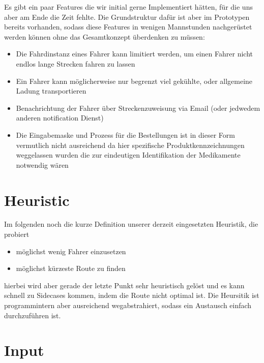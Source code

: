 \documentclass[a4]{article}
\begin{document}
Es gibt ein paar Features die wir initial gerne Implementiert hätten, für die uns aber am Ende die Zeit fehlte. Die Grundstruktur dafür ist aber im Prototypen bereits vorhanden, sodass diese Features in wenigen
Mannstunden nachgerüstet werden können ohne das Gesamtkonzept überdenken zu müssen:

\begin{itemize}
\item Die Fahrdinstanz eines Fahrer kann limitiert werden, um einen Fahrer nicht endlos lange Strecken fahren zu lassen
\item Ein Fahrer kann möglicherweise nur begrenzt viel gekühlte, oder allgemeine Ladung transportieren
\item Benachrichtung der Fahrer über Streckenzuweisung via Email (oder jedwedem anderen notification Dienst)
\item Die Eingabemaske und Prozess für die Bestellungen ist in dieser Form vermutlich nicht ausreichend da hier spezifische Produktkennzeichnungen weggelassen wurden die zur eindeutigen Identifikation der Medikamente notwendig wären
\end{itemize}

\section{Heuristic}

Im folgenden noch die kurze Definition unserer derzeit eingesetzten Heuristik, die probiert

\begin{itemize}
\item möglichst wenig Fahrer einzusetzen
\item möglichst kürzeste Route zu finden
\end{itemize}

hierbei wird aber gerade der letzte Punkt sehr heuristisch gelöst und es kann schnell zu Sidecases kommen, indem die Route nicht optimal ist. Die Heursitik ist programmintern aber ausreichend wegabstrahiert, sodass ein Austausch einfach durchzuführen ist.

\section{Input}
\end{document}
